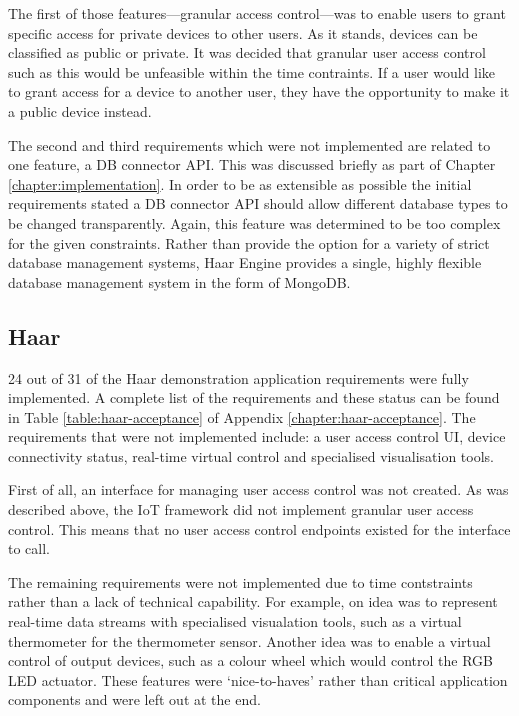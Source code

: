       The first of those features---granular access control---was to enable users to grant specific access for private devices to other users. As it stands, devices can be classified as public or private. It was decided that granular user access control such as this would be unfeasible within the time contraints. If a user would like to grant access for a device to another user, they have the opportunity to make it a public device instead.

      The second and third requirements which were not implemented are related to one feature, a DB connector API. This was discussed briefly as part of Chapter \ref{chapter:implementation}. In order to be as extensible as possible the initial requirements stated a DB connector API should allow different database types to be changed transparently. Again, this feature was determined to be too complex for the given constraints. Rather than provide the option for a variety of strict database management systems, Haar Engine provides a single, highly flexible database management system in the form of MongoDB.

    \subsection{Haar}
      24 out of 31 of the Haar demonstration application requirements were fully implemented. A complete list of the requirements and these status can be found in Table \ref{table:haar-acceptance} of Appendix \ref{chapter:haar-acceptance}. The requirements that were not implemented include: a user access control UI, device connectivity status, real-time virtual control and specialised visualisation tools.

      First of all, an interface for managing user access control was not created. As was described above, the IoT framework did not implement granular user access control. This means that no user access control endpoints existed for the interface to call.

      The remaining requirements were not implemented due to time contstraints rather than a lack of technical capability. For example, on idea was to represent real-time data streams with specialised visualation tools, such as a virtual thermometer for the thermometer sensor. Another idea was to enable a virtual control of output devices, such as a colour wheel which would control the RGB LED actuator. These features were `nice-to-haves' rather than critical application components and were left out at the end.

